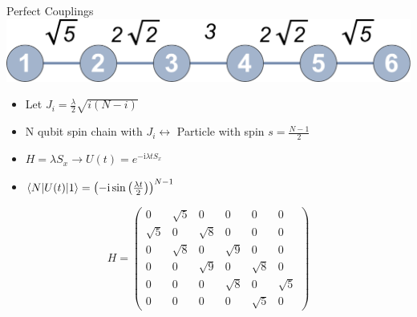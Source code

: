 \documentclass{beamer}
\begin{document}
\begin{frame}[t]{Perfect Couplings}
	\includegraphics[trim=0mm 0 0 0mm, width=\textwidth]{Images/chain6_perf}
	\begin{itemize}
		\item Let $J_i = \frac{\lambda}{2}\sqrt{i(N-i)}$
		\item N qubit spin chain with $J_i \leftrightarrow$ Particle with spin $s = \frac{N-1}{2}$ %
		\item $H=\lambda S_x \rightarrow U(t)=e^{-\text{i}\lambda t S_x}$
		\item $\braket{N|U(t)|1} = \left( -\text{i}\sin\left(\frac{\lambda t}{2}\right) \right)^{N-1}$
	\end{itemize}	
   	\[H = \begin{pmatrix}
	0 & \sqrt{5} & 0 & 0 & 0 & 0 \\
	\sqrt{5} & 0 & \sqrt{8} & 0 & 0 & 0 \\
	0 & \sqrt{8} & 0 & \sqrt{9} & 0 & 0 \\
	0 & 0 & \sqrt{9} & 0 & \sqrt{8} & 0 \\
	0 & 0 & 0 & \sqrt{8} & 0 & \sqrt{5} \\
	0 & 0 & 0 & 0 & \sqrt{5} & 0 
	\end{pmatrix}\]
\end{frame}
\end{document}
